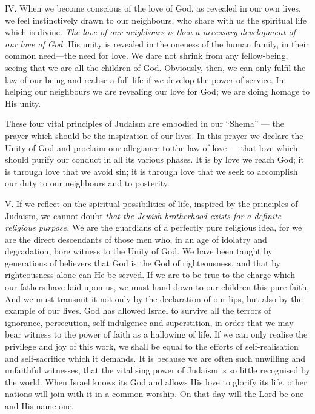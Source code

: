 \label{love}
IV. When we become conscious of the love
of God, as revealed in our own lives, we feel
instinctively drawn to our neighbours, who
share with us the spiritual life which is
divine. \textsl{The love of our neighbours is then a
necessary development of our love of God.}
His unity is revealed in the oneness of the
human family, in their common need—the
need for love. We dare not shrink from
any fellow-being, seeing that we are all
the children of God. Obviously, then, we
can only fulfil the law of our being and
realise a full life if we develop the power of
service. In helping our neighbours we are
revealing our love for God; we are doing
homage to His unity.

These four vital principles of Judaism are
embodied in our “Shema” — the prayer
which should be the inspiration of our lives.
In this prayer we declare the Unity of God
and proclaim our allegiance to the law of
love — that love which should purify our conduct
in all its various phases. It is by love
we reach God; it is through love that we
avoid sin; it is through love that we seek
to accomplish our duty to our neighbours
and to posterity.

\label{brotherhood}
V. If we reflect on the spiritual possibilities
of life, inspired by the principles of Judaism,
we cannot doubt \textsl{that the Jewish brotherhood
exists for a definite religious purpose.} We
are the guardians of a perfectly pure religious
idea, for we are the direct descendants of
those men who, in an age of idolatry and
degradation, bore witness to the Unity of
God. We have been taught by generations of
believers that God is the God of
righteousness, and that by righteousness
alone can He be served. If we are to be
true to the charge which our fathers have
laid upon us, we must hand down to our
children this pure faith, And we must
transmit it not only by the declaration of our
lips, but also by the example of our lives.
God has allowed Israel to survive all the
terrors of ignorance, persecution, self-indulgence
and superstition, in order that we may
bear witness to the power of faith as a
hallowing of life. If we can only realise the
privilege and joy of this work, we shall be
equal to the efforts of self-realisation and
self-sacrifice which it demands. It is because
we are often such unwilling and unfaithful
witnesses, that the vitalising power of Judaism
is so little recognised by the world. When
Israel knows its God and allows His
love to glorify its life, other nations will
join with it in a common worship. On
that day will the Lord be one and His
name one.

